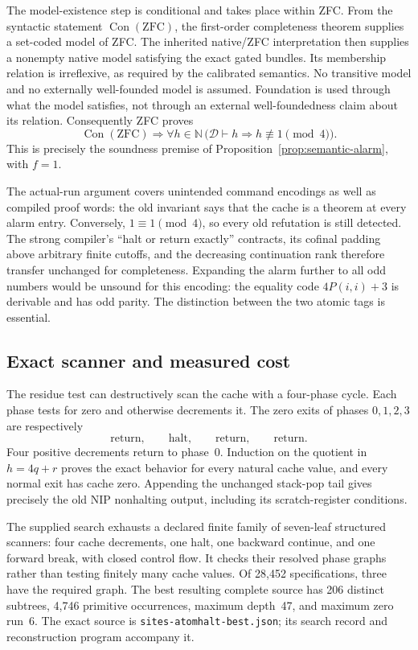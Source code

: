 The model-existence step is conditional and takes place within ZFC.
From the syntactic statement $\operatorname{Con}(\mathrm{ZFC})$, the
first-order completeness theorem supplies a set-coded model of ZFC.
The inherited native/ZFC interpretation then supplies a nonempty native
model satisfying the exact gated bundles.  Its membership relation is
irreflexive, as required by the calibrated semantics.\cite{k215,code254}
No transitive model and no externally well-founded model is assumed.
Foundation is used through what the model satisfies, not through an
external well-foundedness claim about its relation.
Consequently ZFC proves
\[
 \operatorname{Con}(\mathrm{ZFC})\Longrightarrow
 \forall h\in\mathbb N\,
   \bigl(\mathcal D\vdash h\Longrightarrow h\not\equiv1\pmod4\bigr).
\]
This is precisely the soundness premise of
Proposition~\ref{prop:semantic-alarm}, with $f=1$.

The actual-run argument covers unintended command encodings as well as
compiled proof words: the old invariant says that the cache is a theorem
at every alarm entry.  Conversely, $1\equiv1\pmod4$, so every old
refutation is still detected.  The strong compiler's ``halt or return
exactly'' contracts, its cofinal padding above arbitrary finite cutoffs,
and the decreasing continuation rank therefore transfer unchanged for
completeness.\cite{k215}
Expanding the alarm further to all odd numbers would be unsound for
this encoding: the equality code $4P(i,i)+3$ is derivable and has odd
parity.  The distinction between the two atomic tags is essential.

\subsection{Exact scanner and measured cost}

The residue test can destructively scan the cache with a four-phase
cycle.  Each phase tests for zero and otherwise decrements it.  The
zero exits of phases $0,1,2,3$ are respectively
\[
  \text{return},\qquad\text{halt},\qquad
  \text{return},\qquad\text{return}.
\]
Four positive decrements return to phase~$0$.
Induction on the quotient in $h=4q+r$ proves the exact behavior for
every natural cache value, and every normal exit has cache zero.
Appending the unchanged stack-pop tail gives precisely the old NIP
nonhalting output, including its scratch-register conditions.

The supplied search exhausts a declared finite family of seven-leaf
structured scanners: four cache decrements, one halt, one backward
continue, and one forward break, with closed control flow.
It checks their resolved phase graphs rather than testing finitely many
cache values.  Of 28,452 specifications, three have the required graph.
The best resulting complete source has 206 distinct subtrees,
4,746 primitive occurrences, maximum depth~47, and maximum zero run~6.
The exact source is \texttt{sites-atomhalt-best.json}; its search record
and reconstruction program accompany it.

